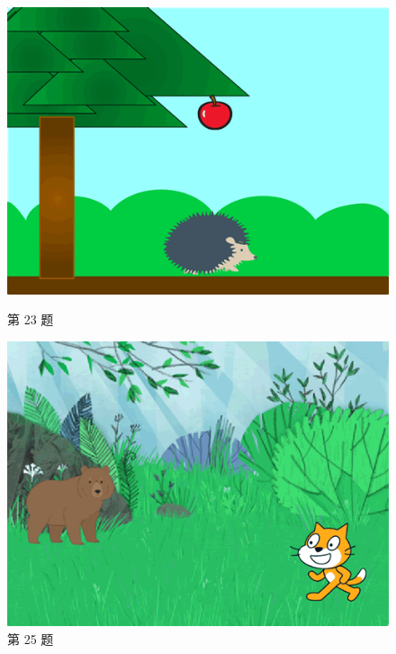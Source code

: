 \documentclass[10pt, a4paper]{article}
\begin{document}
\begin{enumerate}
        \begin{figure}[htbp]
            \centering
            \begin{minipage}[t]{.22\textwidth}
                \centering
                \includegraphics[width=\textwidth]{figure/23.png}
                \caption*{第 23 题}
            \end{minipage}
            \begin{minipage}[t]{.22\textwidth}
                \includegraphics[width=\textwidth]{figure/25.png}
                \caption*{第 25 题}
            \end{minipage}
            \begin{minipage}[t]{.26\textwidth}

\end{minipage}
\end{figure}
\end{enumerate}
\end{document}
